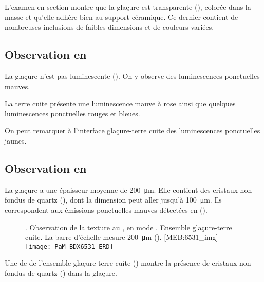 L'examen en section montre que la glaçure est transparente 
(), colorée dans la masse et qu'elle 
adhère bien au support céramique. Ce dernier contient de nombreuses 
inclusions de faibles dimensions et de couleurs variées.

\subsection{Observation en \CL}
La glaçure n'est pas luminescente (). 
On y observe des luminescences ponctuelles mauves.

La terre cuite présente une luminescence mauve à rose ainsi que 
quelques luminescences ponctuelles rouges et bleues.

On peut remarquer à l'interface glaçure-terre cuite des luminescences 
ponctuelles jaunes.

\subsection{Observation en \MEB[ie]}
La glaçure a une épaisseur moyenne de \SI{200}{\um}. Elle contient 
des cristaux non fondus de quartz (\quartz), dont la dimension peut 
aller jusqu'à \SI{100}{\um}. Ils correspondent aux émissions 
ponctuelles mauves détectées en \CL ().

\begin{figure}[htb]
  \setlength{\imgwidth}{7cm}
  \setlength{\mylength}{1cm+\imgwidth}
  \setlength{\sidecapwidth}{\linewidth-\sidecapsep-\mylength-1cm}
  \renewcommand*{\sidecapfloatwidth}{\mylength}%
  \RaggedLeft
  \begin{sidecaption}{%
    \legendeD.
    Observation de la texture au \MEB, en mode \ERD. 
    Ensemble glaçure-terre cuite. La barre d'échelle mesure 
    \SI{200}{\um} ().%
  }[MEB:6531_img]
    \texttt{[image: PaM\_BDX6531\_ERD]}%
  \end{sidecaption}
\end{figure}

Une \carto de \RX de l'ensemble glaçure-terre cuite 
() montre la présence de cristaux non 
fondus de quartz (\quartz) dans la glaçure.


